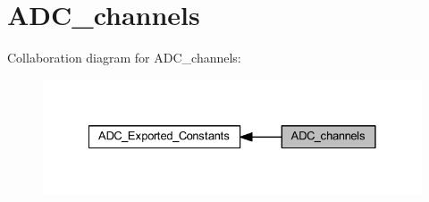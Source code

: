 \hypertarget{group___a_d_c__channels}{}\section{A\+D\+C\+\_\+channels}
\label{group___a_d_c__channels}
Collaboration diagram for A\+D\+C\+\_\+channels\+:
\nopagebreak
\begin{figure}[H]
\begin{center}
\leavevmode
\includegraphics[width=328pt]{group___a_d_c__channels}
\end{center}
\end{figure}

